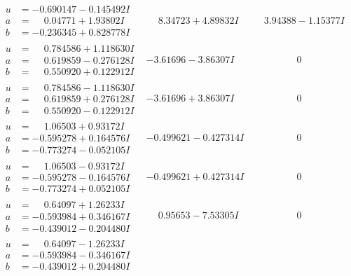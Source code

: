 \documentclass[1p]{elsarticle_modified}
\theoremstyle{definition}
\begin{document}
$$\begin{array}{c|c|c}
\begin{aligned}
u &= -0.690147 - 0.145492 I \\
a &= \phantom{-}0.04771 + 1.93802 I \\
b &= -0.236345 + 0.828778 I\end{aligned}
 & \phantom{-}8.34723 + 4.89832 I & \phantom{-}3.94388 - 1.15377 I \\ \hline\begin{aligned}
u &= \phantom{-}0.784586 + 1.118630 I \\
a &= \phantom{-}0.619859 - 0.276128 I \\
b &= \phantom{-}0.550920 + 0.122912 I\end{aligned}
 & -3.61696 - 3.86307 I & \phantom{-0.000000 } 0 \\ \hline\begin{aligned}
u &= \phantom{-}0.784586 - 1.118630 I \\
a &= \phantom{-}0.619859 + 0.276128 I \\
b &= \phantom{-}0.550920 - 0.122912 I\end{aligned}
 & -3.61696 + 3.86307 I & \phantom{-0.000000 } 0 \\ \hline\begin{aligned}
u &= \phantom{-}1.06503 + 0.93172 I \\
a &= -0.595278 + 0.164576 I \\
b &= -0.773274 - 0.052105 I\end{aligned}
 & -0.499621 - 0.427314 I & \phantom{-0.000000 } 0 \\ \hline\begin{aligned}
u &= \phantom{-}1.06503 - 0.93172 I \\
a &= -0.595278 - 0.164576 I \\
b &= -0.773274 + 0.052105 I\end{aligned}
 & -0.499621 + 0.427314 I & \phantom{-0.000000 } 0 \\ \hline\begin{aligned}
u &= \phantom{-}0.64097 + 1.26233 I \\
a &= -0.593984 + 0.346167 I \\
b &= -0.439012 - 0.204480 I\end{aligned}
 & \phantom{-}0.95653 - 7.53305 I & \phantom{-0.000000 } 0 \\ \hline\begin{aligned}
u &= \phantom{-}0.64097 - 1.26233 I \\
a &= -0.593984 - 0.346167 I \\
b &= -0.439012 + 0.204480 I\end{aligned}

\end{array}$$
\end{document}
